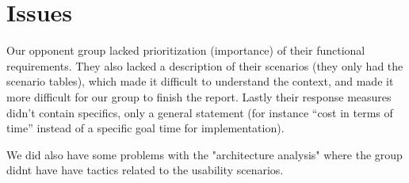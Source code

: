 
\section{Issues}
\label{sec:issues}
Our opponent group lacked prioritization (importance) of their functional
requirements. They also lacked a description of their scenarios (they only had
the scenario tables), which made it difficult to understand the context, and
made it more difficult for our group to finish the report. Lastly their
response measures didn't contain specifics, only a general statement (for
instance ``cost in terms of time'' instead of a specific goal time for
implementation).

We did also have some problems with the "architecture analysis" where the
group didnt have have tactics related to the usability scenarios.
